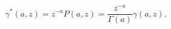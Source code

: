 \[\gamma^{*}\left(a,z\right)=z^{-a}P\left(a,z\right)=\frac{z^{-a}}{\Gamma\left(a%
\right)}\gamma\left(a,z\right).\]